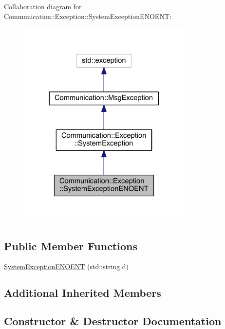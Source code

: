 Collaboration diagram for Communication\+:\+:Exception\+:\+:System\+Exception\+E\+N\+O\+E\+N\+T\+:\nopagebreak
\begin{figure}[H]
\begin{center}
\leavevmode
\includegraphics[width=248pt]{class_communication_1_1_exception_1_1_system_exception_e_n_o_e_n_t__coll__graph}
\end{center}
\end{figure}
\subsection*{Public Member Functions}
\begin{DoxyCompactItemize}
\item 
\hyperlink{class_communication_1_1_exception_1_1_system_exception_e_n_o_e_n_t_a658cd6b4e6f95c273050a740e46e4cbe}{System\+Exception\+E\+N\+O\+E\+N\+T} (std\+::string d)
\end{DoxyCompactItemize}
\subsection*{Additional Inherited Members}


\subsection{Constructor \& Destructor Documentation}
\hypertarget{class_communication_1_1_exception_1_1_system_exception_e_n_o_e_n_t_a658cd6b4e6f95c273050a740e46e4cbe}{}
